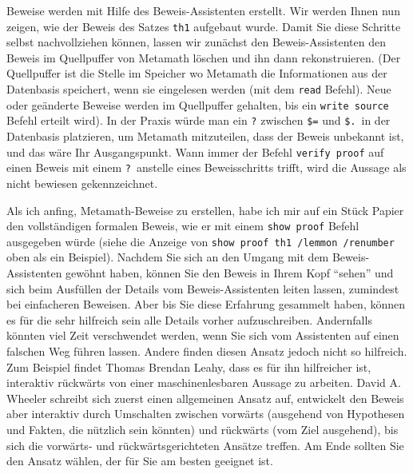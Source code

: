 Beweise werden mit Hilfe des Beweis-Assistenten erstellt.
Wir werden Ihnen nun zeigen, wie der Beweis des Satzes \texttt{th1} aufgebaut wurde.  Damit Sie diese Schritte selbst nachvollziehen können, lassen wir zunächst den Beweis-Assistenten den Beweis im Quellpuffer von Metamath löschen und ihn dann rekonstruieren.  (Der Quellpuffer ist die Stelle im Speicher wo Metamath die Informationen aus der Datenbasis speichert, wenn sie eingelesen werden (mit dem \texttt{read} Befehl).  Neue oder geänderte Beweise
werden im Quellpuffer gehalten, bis ein \texttt{write source} Befehl erteilt wird).  In der Praxis würde man ein \texttt{?}\index{\texttt{]}@\texttt{?}\ innerhalb von Beweisen} zwischen \texttt{\$=} und
\texttt{\$.}\ in der Datenbasis platzieren, um Metamath mitzuteilen, dass der Beweis unbekannt ist, und das wäre Ihr Ausgangspunkt.  Wann immer der Befehl \texttt{verify proof} auf einen Beweis mit einem \texttt{?}\ anstelle eines Beweisschritts trifft, wird die Aussage als nicht bewiesen gekennzeichnet.

Als ich anfing, Metamath-Beweise zu erstellen, habe ich mir auf ein Stück Papier den vollständigen formalen Beweis, wie er mit einem \texttt{show proof} Befehl ausgegeben würde (siehe die Anzeige von \texttt{show proof th1 /lemmon /re\-num\-ber} oben als ein Beispiel).  Nachdem Sie sich an den Umgang mit dem Beweis-Assistenten gewöhnt haben, können Sie den Beweis in Ihrem Kopf "`sehen"' und sich beim Ausfüllen der Details vom Beweis-Assistenten leiten lassen, zumindest bei einfacheren Beweisen. Aber bis Sie diese Erfahrung gesammelt haben, können es für die sehr hilfreich sein alle Details vorher aufzuschreiben.
Andernfalls könnten viel Zeit verschwendet werden, wenn Sie sich vom Assistenten auf einen falschen Weg führen lassen.
Andere finden diesen Ansatz jedoch nicht so hilfreich.
Zum Beispiel findet Thomas Brendan Leahy, dass es für ihn hilfreicher ist, interaktiv rückwärts von einer maschinenlesbaren Aussage zu arbeiten.
David A. Wheeler schreibt sich zuerst einen allgemeinen Ansatz auf, entwickelt den Beweis aber interaktiv durch Umschalten zwischen
vorwärts (ausgehend von Hypothesen und Fakten, die nützlich sein könnten) und rückwärts (vom Ziel ausgehend), bis sich die vorwärts- und rückwärtsgerichteten Ansätze treffen.
Am Ende sollten Sie den Ansatz wählen, der für Sie am besten geeignet ist.

